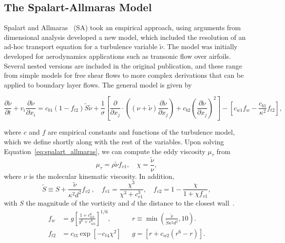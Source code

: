 \subsection{The Spalart-Allmaras Model}
Spalart and Allmaras~\cite{spalartOneequationTurbulenceModel1992} (SA) took an empirical approach, using arguments from dimensional analysis developed a new model, which included the resolution of an ad-hoc transport equation for a turbulence variable $\tilde \nu$. The model was initially developed for aerodynamics applications such as transonic flow over airfoils. Several nested versions are included in the original publication, and these range from simple models for free shear flows to more complex derivations that can be applied to boundary layer flows. The general model is given by
\begin{eqBox}
\begin{equation}
    \frac{\partial \tilde{\nu}}{\partial t} 
    + v_i \frac{\partial\tilde\nu}{\partial x_i} 
    = c_{b1} (1-f_{t2}) \tilde S \tilde \nu
    + \frac{1}{\sigma} 
     \left[ \frac{\partial}{\partial x_j} \cdot \left((\nu + \tilde \nu)\frac{\partial\tilde\nu}{\partial x_j} \right) 
      + c_{b2}\left(\frac{\partial\tilde \nu}{\partial x_j} \right)^2\right]
    - \left[c_{w1}f_w - \frac{c_{b1}}{\kappa^2}f_{t2}\right],
    \label{eq:spalart_allmaras}
\end{equation}
\end{eqBox}
where $c$ and $f$ are empirical constants and functions of the turbulence model, which we define shortly along with the rest of the variables. Upon solving Equation~\ref{eq:spalart_allmaras}, we can compute the eddy viscosity $\mu_\tau$ from
\begin{equation}
    \mu_\tau=\rho \tilde \nu f_{v1},\quad \chi=\frac{\tilde \nu}{\nu},
    \label{eq:sa_eddyviscosity}
\end{equation}
where $\nu$ is the molecular kinematic viscosity. In addition,
\begin{equation}
    \tilde S \equiv S + \frac{\tilde \nu}{\kappa^2 d^2}f_{v2}~,\quad f_{v1}=\frac{\chi^3}{\chi^3+c_{v1}^3},\quad f_{v2}=1-\frac{\chi}{1+\chi f_{v1}},
\end{equation}
with $S$ the magnitude of the vorticity and $d$ the distance to the closest wall~\cite{spalartallmaras}. 
\begin{align}
    f_w&=g
    \left[\frac{1+c_{w3}^6}{g^6+c_{w3}^6}\right]^{1/6},& &r\equiv \min\left(\frac{\tilde\nu}{\tilde S \kappa^2 d^2},10\right). \\
    f_{t2}&=c_{t3} \exp \left[-c_{t4}\chi^2\right] & &g=\left[r+c_{w2}\left(r^6-r\right)\right].
\end{align}
